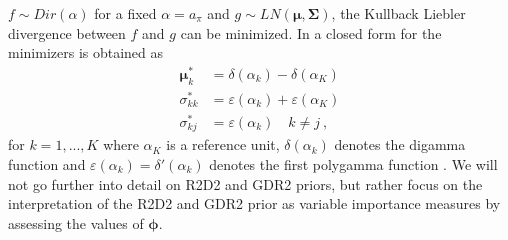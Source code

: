 $f\sim Dir(\alpha)$ for a fixed $\alpha = a_{\pi}$ and $g\sim LN(\boldsymbol{\mu}, \boldsymbol{\Sigma})$, the Kullback Liebler divergence \citep{Kullback_Liebler_1951} between $f$ and $g$ can be minimized. In \citet{aguilar2024generalized} a closed form for the minimizers is obtained as 
\begin{equation}
    \begin{aligned}
    \boldsymbol{\mu}^*_k &= \delta(\alpha_k) - \delta(\alpha_K) \\ 
    \sigma_{kk}^* &= \varepsilon(\alpha_k) + \varepsilon(\alpha_K) \\  \sigma_{kj}^* &= \varepsilon(\alpha_k) \quad k \neq j\ ,
    \end{aligned}
\end{equation}
for $k=1, ..., K$ where $\alpha_K$ is a reference unit, $\delta(\alpha_k)$ denotes the digamma function and $\varepsilon(\alpha_k) = \delta'(\alpha_k)$ denotes the first polygamma function \citep[pages 258-260]{abramowitz1972handbook}. We will not go further into detail on R2D2 and GDR2 priors, but rather focus on the interpretation of the R2D2 and GDR2 prior as variable importance measures by assessing the values of $\boldsymbol{\phi}$.






